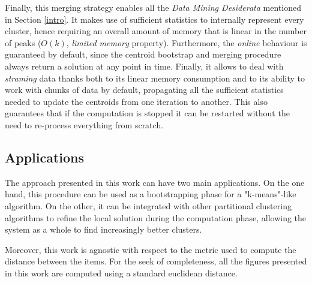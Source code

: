 Finally, this merging strategy enables all the \emph{Data Mining Desiderata} mentioned in Section 
\ref{intro}. It makes use of sufficient statistics to internally represent every cluster, hence 
requiring an overall amount of memory that is linear in the number of peaks ($O(k)$, \emph{limited memory}
property). Furthermore, the \emph{online} behaviour is guaranteed by default, since the centroid
bootstrap and merging procedure always return a solution at any point in time. Finally, it allows
to deal with \emph{straming} data thanks both to its linear memory consumption and to its ability to
work with chunks of data by default, propagating all the sufficient statistics needed to update the 
centroids from one iteration to another. This also guarantees that if the computation is stopped
it can be restarted without the need to re-process everything from scratch.


\subsection{Applications}
The approach presented in this work can have two main applications. On the one hand,
this procedure can be used as a bootstrapping phase for a  "k-means"-like algorithm. 
On the other, it can be integrated with other partitional clustering algorithms to
refine the local solution during the computation phase, allowing the system as a
whole to find increasingly better clusters.

Moreover, this work is agnostic with respect
to the metric used to compute the distance between the items. For the seek of
completeness, all the figures presented in this work are computed using a
standard euclidean distance.

